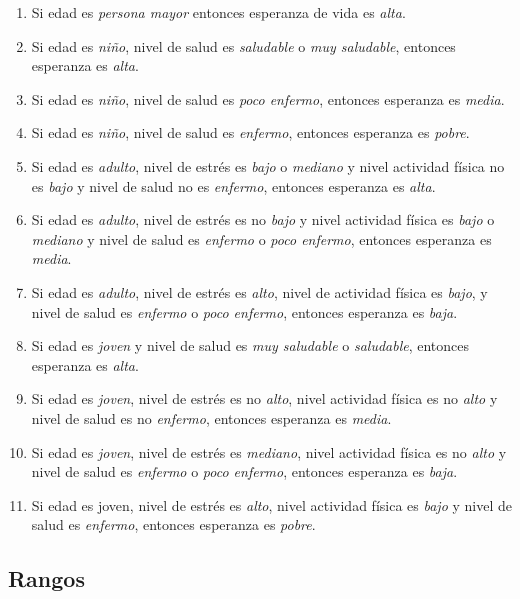 \documentclass[11pt]{article}
\begin{document}
\begin{enumerate}
    \item Si edad es \emph{persona mayor} entonces esperanza de vida es \emph{alta}.
    \item Si edad es \emph{niño}, nivel de salud es \emph{saludable} o \emph{muy saludable}, entonces esperanza es \emph{alta}.
    \item Si edad es \emph{niño}, nivel de salud es \emph{poco enfermo}, entonces esperanza es \emph{media}. 
    \item Si edad es \emph{niño}, nivel de salud es \emph{enfermo}, entonces esperanza es \emph{pobre}.
    \item Si edad es \emph{adulto}, nivel de estrés es \emph{bajo} o \emph{mediano} y nivel actividad física no es \emph{bajo} y nivel de salud no es \emph{enfermo}, entonces esperanza es \emph{alta}. 
    \item Si edad es \emph{adulto}, nivel de estrés es no \emph{bajo} y nivel actividad física es \emph{bajo} o \emph{mediano} y nivel de salud es \emph{enfermo} o \emph{poco enfermo}, entonces esperanza es \emph{media}.
    \item Si edad es \emph{adulto}, nivel de estrés es \emph{alto}, nivel de actividad física es \emph{bajo}, y nivel de salud es \emph{enfermo} o \emph{poco enfermo}, entonces esperanza es \emph{baja}.
    \item Si edad es \emph{joven} y nivel de salud es \emph{muy saludable} o \emph{saludable}, entonces esperanza es \emph{alta}. 
    \item Si edad es \emph{joven}, nivel de estrés es no \emph{alto}, nivel actividad física es no \emph{alto} y nivel de salud es no \emph{enfermo}, entonces esperanza es \emph{media}. 
    \item Si edad es \emph{joven}, nivel de estrés es \emph{mediano}, nivel actividad física es no \emph{alto} y nivel de salud es \emph{enfermo} o \emph{poco enfermo}, entonces esperanza es \emph{baja}.
    \item Si edad es joven, nivel de estrés es \emph{alto}, nivel actividad física es \emph{bajo} y nivel de salud es \emph{enfermo}, entonces esperanza es \emph{pobre}.
\end{enumerate}

\subsection*{Rangos}
\end{document}
